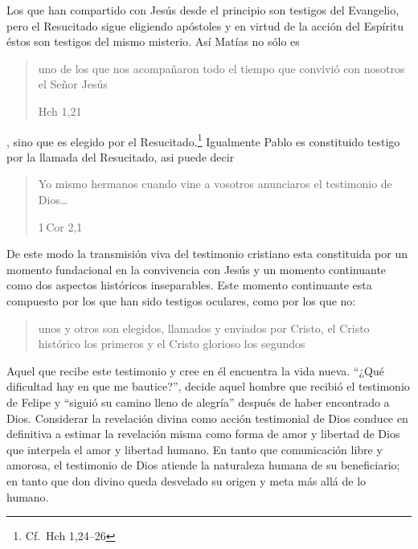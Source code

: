 Los que han compartido con Jesús desde el principio son testigos del Evangelio, pero el Resucitado sigue eligiendo apóstoles y en virtud de la acción del Espíritu éstos son testigos del mismo misterio.\autocite[Cf.][576]{ninot2009tf} Así Matías no sólo es \blockquote[Hch 1,21]{uno de los que nos acompañaron todo el tiempo que convivió con nosotros el Señor Jesús}, sino que es elegido por el Resucitado.\footnote{Cf.~Hch 1,24--26} Igualmente Pablo es constituido testigo por la llamada del Resucitado, asi puede decir \blockquote[1\,Cor 2,1]{Yo mismo hermanos cuando vine a vosotros anunciaros el testimonio de Dios\ldots}. De este modo la transmisión viva del testimonio cristiano esta constituida por un momento fundacional en la convivencia con Jesús y un momento continuante como dos aspectos históricos inseparables.\autocite[Cf.][148]{prades2015testimonio} Este momento continuante esta compuesto por los que han sido testigos oculares, como por los que no: \blockquote[{\cite[148]{prades2015testimonio}}]{unos y otros son elegidos, llamados y enviados por Cristo, el Cristo histórico los primeros y el Cristo glorioso los segundos}. Aquel que recibe este testimonio y cree en él encuentra la vida nueva. \enquote{¿Qué dificultad hay en que me bautice?}, decide aquel hombre que recibió el testimonio de Felipe y \enquote{siguió su camino lleno de alegría} después de haber encontrado a Dios. Considerar la revelación divina como acción testimonial de Dios conduce en definitiva a estimar la revelación misma como forma de amor y libertad de Dios que interpela el amor y libertad humano. En tanto que comunicación libre y amorosa, el testimonio de Dios atiende la naturaleza humana de su beneficiario; en tanto que don divino queda desvelado su origen y meta más allá de lo humano.\autocite[Cf.][152]{prades2015testimonio}
